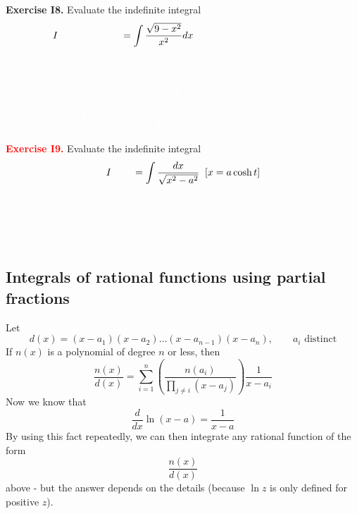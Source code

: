 \documentclass{article}
\begin{document}
\textbf{Exercise I8.}
Evaluate  the indefinite integral
\begin{eqnarray}
& I & =\int  \frac{\sqrt{9-x^2}}{x^2}  dx \; \;
\textcolor{white}{[x=3\sin \theta, \;\; -\frac{\pi}{2} \leq \theta \leq \frac{\pi}{2}] \nonumber} \\
&   & \textcolor{white}{ =\int  \frac{\sqrt{9-(3\sin \theta)^2} }{(3\sin \theta)^2}  d (3\sin \theta)  \nonumber} \\
&   &  \textcolor{white}{= \int  \frac{3\cos \theta  }{9\sin^2 \theta } \; (3\cos
\theta) = \int  \frac{\cos^2  \theta  }{\sin^2 \theta } d \theta  \nonumber} \\
& & \textcolor{white}{=  \int  \frac{1- \sin^2  \theta  }{\sin^2 \theta } d \theta  = \int \left(  \frac{1 }{\sin^2 \theta } -1 \right) d \theta  \nonumber =  -\cot \theta -\theta +C  \nonumber}
\end{eqnarray}
\vspace{100px}

\textcolor{red}{\textbf{Exercise I9.}}
Evaluate the indefinite integral
\begin{eqnarray}
& I & =\int  \frac{d x} {\sqrt{x^2-a^2} }  \; \;
[x=a \cosh t]  \nonumber \\
&   & \textcolor{white}{=\int  \frac{ d(a\cosh t)} { \sqrt{a^2(\cosh^2-1)} }  } \nonumber \\
&   & \textcolor{white}{= \int dt = t +C = \cosh^{-1} \frac{x  }{a } +C}  \nonumber
\end{eqnarray}
\vspace{100px}

%
%

\subsection{Integrals of rational functions using partial fractions}

Let 
$$
d(x) = (x-a_1) (x-a_2) \ldots (x-a_{n-1})(x-a_n), \qquad a_i \mbox{ distinct}
$$
If $n(x)$ is a polynomial of degree $n$ or less, then
$$
\frac{n(x)}{d(x)} = \sum_{i=1}^n \left( \frac{n(a_i)}{\prod_{j \neq i} (x-a_j)} \right) \frac{1}{x-a_i}
$$
Now we know that
$$
\frac{d}{dx} \ln (x-a) = \frac{1}{x-a}
$$
By using this fact repeatedly, we can then integrate any rational function of the form
$$
\frac{n(x)}{d(x)}
$$
above - but the answer depends on the details (because $\ln z$ is only defined for positive $z$).\\
\hrulefill
\end{document}
